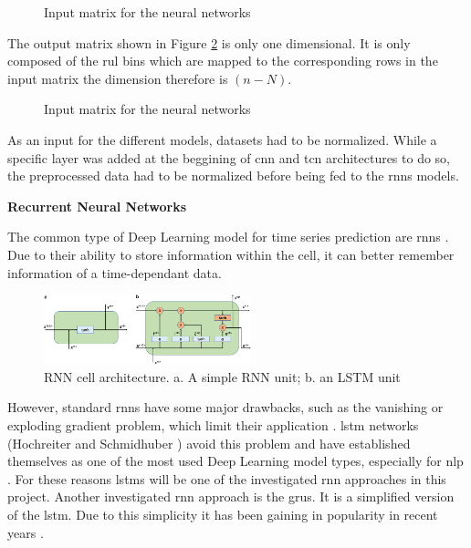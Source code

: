 \documentclass[conference]{IEEEtran}
\begin{document}
\begin{figure}[htp]
	\centering
	
	\caption{Input matrix for the neural networks}
	\label{fig:input_matrix}
\end{figure}

The output matrix shown in Figure \ref{fig:output_matrix} is only one dimensional. It is only composed of the \gls{rul} bins which are mapped to the corresponding rows in the input matrix the dimension therefore is $ (n-N) $.

\begin{figure}[htp]
	\centering
	
	\caption{Input matrix for the neural networks}
	\label{fig:output_matrix}
\end{figure}

As an input for the different models, datasets had to be normalized. While a specific layer was added at the beggining of \gls{cnn} and \gls{tcn} architectures to do so, the preprocessed data had to be normalized before being fed to the \glspl{rnn} models.


\noindent
\textbf{Recurrent Neural Networks}

The common type of Deep Learning model for time series prediction are \glspl{rnn} \cite{Bai2018}. Due to their ability to store information within the cell, it can better remember information of a time-dependant data. 


\begin{figure}[htp]
	\centering
	\includegraphics[width=6cm]{RNN-cell-architecture.png}
	\caption{RNN cell architecture. a. A simple RNN unit; b. an LSTM unit \cite{Chen2021}}
	\label{fig:RNN-classification}
\end{figure}

However, standard \glspl{rnn} have some major drawbacks, such as the vanishing or exploding gradient problem, which limit their application \cite{Bengio1994}. \gls{lstm} networks (Hochreiter and Schmidhuber \cite{Hochreiter1997}) avoid this problem and have established themselves as one of the most used Deep Learning model types, especially for \gls{nlp} \cite{Wu2016}. For these reasons \glspl{lstm} will be one of the investigated \gls{rnn} approaches in this project. Another investigated \gls{rnn} approach is the \glspl{gru}. It is a simplified version of the \gls{lstm}. Due to this simplicity it has been gaining in popularity in recent years \cite{Rana2016}. 
\end{document}
